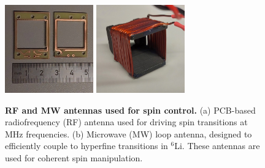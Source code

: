 \begin{figure}[h]
    \centering
     \phantom{4}
    \includegraphics[width=1.5in]{imgs/RF.jpg}
    \hspace{1cm}
     \phantom{4}
    \includegraphics[width=1.5in]{imgs/MW.jpg}
    \caption{
        \textbf{RF and MW antennas used for spin control.}
        (a) PCB-based radiofrequency (RF) antenna used for driving spin transitions at MHz frequencies. 
        (b) Microwave (MW) loop antenna, designed to efficiently couple to hyperfine transitions in $^6$Li. 
        These antennas are used for coherent spin manipulation.
    }
    \label{fig:rfmw}
\end{figure}










